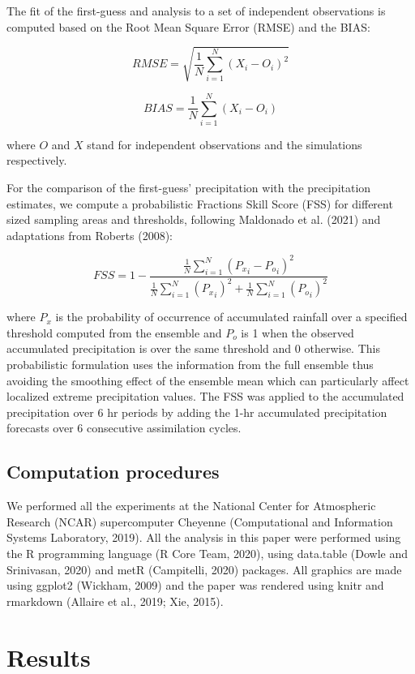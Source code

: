 \documentclass[final,5p,times,twocolumn,authoryear]{elsarticle} %
\begin{document}
The fit of the first-guess and analysis to a set of independent observations is computed based on the Root Mean Square Error (RMSE) and the BIAS:

\[\mathit{RMSE} = \sqrt{\frac{1}{N}\sum_{i = 1}^{N} (X_i - O_i)^{2}}\]

\[\mathit{BIAS} = \frac{1}{N}\sum_{i = 1}^{N} (X_i - O_i)\]

where \(O\) and \(X\) stand for independent observations and the simulations respectively.

For the comparison of the first-guess' precipitation with the precipitation estimates, we compute a probabilistic Fractions Skill Score (FSS) for different sized sampling areas and thresholds, following Maldonado et al. (2021) and adaptations from Roberts (2008):

\[\mathit{FSS} = 1-\frac{\frac{1}{N}\sum_{i=1}^{N} ({P_x}_i-{P_o}_i)^{2}}{\frac{1}{N}\sum_{i=1}^{N} ({P_x}_i)^{2}+\frac{1}{N}\sum_{i=1}^{N} ({P_o}_i)^{2}} \]

where \({P_x}\) is the probability of occurrence of accumulated rainfall over a specified threshold computed from the ensemble and \({P_o}\) is 1 when the observed accumulated precipitation is over the same threshold and 0 otherwise. This probabilistic formulation uses the information from the full ensemble thus avoiding the smoothing effect of the ensemble mean which can particularly affect localized extreme precipitation values. The FSS was applied to the accumulated precipitation over 6 hr periods by adding the 1-hr accumulated precipitation forecasts over 6 consecutive assimilation cycles.

\hypertarget{computation-procedures}{%
\subsection{Computation procedures}\label{computation-procedures}}

We performed all the experiments at the National Center for Atmospheric Research (NCAR) supercomputer Cheyenne (Computational and Information Systems Laboratory, 2019). All the analysis in this paper were performed using the R programming language (R Core Team, 2020), using data.table (Dowle and Srinivasan, 2020) and metR (Campitelli, 2020) packages.
All graphics are made using ggplot2 (Wickham, 2009) and the paper was rendered using knitr and rmarkdown (Allaire et al., 2019; Xie, 2015).

\hypertarget{results}{%
\section{Results}\label{results}}
\end{document}
